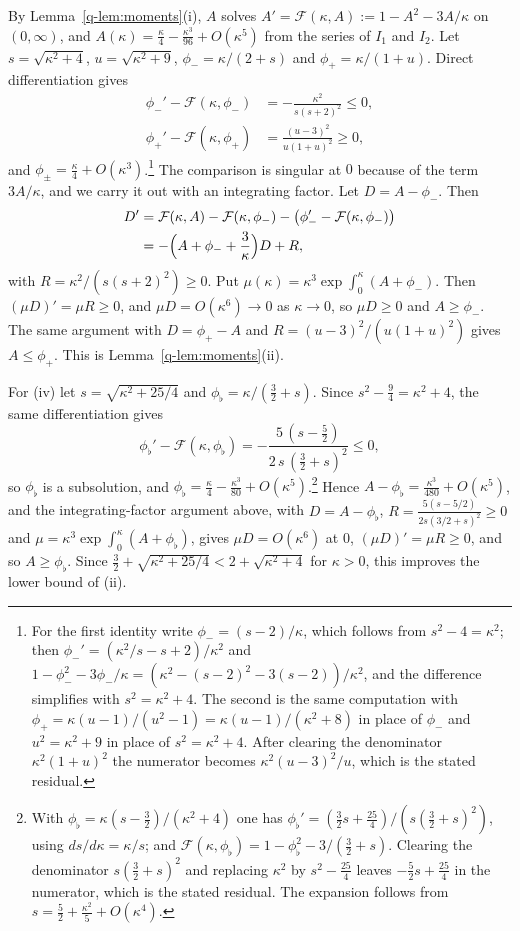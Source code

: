 By Lemma~\ref{q-lem:moments}(i), $A$ solves $A'=\mathcal F(\kappa,A):=1-A^2-
3A/\kappa$ on $(0,\infty)$, and $A(\kappa)=\frac\kappa4-\frac{\kappa^3}{96}+
O(\kappa^5)$ from the series of $I_1$ and $I_2$. Let $s=\sqrt{\kappa^2+4}$,
$u=\sqrt{\kappa^2+9}$, $\phi_-=\kappa/(2+s)$ and $\phi_+=\kappa/(1+u)$. Direct
differentiation gives
\[
\begin{aligned}
\phi_-'-\mathcal F(\kappa,\phi_-)&=-\frac{\kappa^2}{s(s+2)^2}\le0,\\
\phi_+'-\mathcal F(\kappa,\phi_+)&=\frac{(u-3)^2}{u(1+u)^2}\ge0,
\end{aligned}
\]
and $\phi_\pm=\frac\kappa4+O(\kappa^3)$.\footnote{For the first identity write
$\phi_-=(s-2)/\kappa$, which follows from $s^2-4=\kappa^2$; then
$\phi_-'=(\kappa^2/s-s+2)/\kappa^2$ and $1-\phi_-^2-3\phi_-/\kappa=
(\kappa^2-(s-2)^2-3(s-2))/\kappa^2$, and the difference simplifies with
$s^2=\kappa^2+4$. The second is the same computation with
$\phi_+=\kappa(u-1)/(u^2-1)=\kappa(u-1)/(\kappa^2+8)$ in place of $\phi_-$
and $u^2=\kappa^2+9$ in place of $s^2=\kappa^2+4$. After clearing the denominator $\kappa^2(1+u)^2$ the
numerator becomes $\kappa^2(u-3)^2/u$, which is the stated residual.} The comparison is singular at $0$
because of the term $3A/\kappa$, and we carry it out with an integrating
factor. Let $D=A-\phi_-$. Then
\[
\begin{aligned}
D'&=\mathcal F(\kappa,A)-\mathcal F(\kappa,\phi_-)-\bigl(\phi_-'-\mathcal F(
\kappa,\phi_-)\bigr)\\
&=-\Bigl(A+\phi_-+\frac3\kappa\Bigr)D+R,
\end{aligned}
\]
with $R=\kappa^2/(s(s+2)^2)\ge0$. Put $\mu(\kappa)=\kappa^3\exp\int_0^\kappa
(A+\phi_-)$. Then $(\mu D)'=\mu R\ge0$, and $\mu D=O(\kappa^6)\to0$ as
$\kappa\to0$, so $\mu D\ge0$ and $A\ge\phi_-$. The same argument with
$D=\phi_+-A$ and $R=(u-3)^2/(u(1+u)^2)$ gives $A\le\phi_+$. This is
Lemma~\ref{q-lem:moments}(ii).

For (iv) let $s=\sqrt{\kappa^2+25/4}$ and $\phi_\flat=\kappa/(\frac32+s)$.
Since $s^2-\frac94=\kappa^2+4$, the same differentiation gives
\[
\phi_\flat'-\mathcal F(\kappa,\phi_\flat)=-\frac{5\,(s-\frac52)}{2\,s\,
(\frac32+s)^2}\le0,
\]
so $\phi_\flat$ is a subsolution, and $\phi_\flat=\frac\kappa4-\frac{\kappa^3}
{80}+O(\kappa^5)$.\footnote{With $\phi_\flat=\kappa(s-\frac32)/(\kappa^2+4)$ one
has $\phi_\flat'=(\frac32 s+\frac{25}4)/(s(\frac32+s)^2)$, using $ds/d\kappa=
\kappa/s$; and $\mathcal F(\kappa,\phi_\flat)=1-\phi_\flat^2-3/(\frac32+s)$.
Clearing the denominator $s(\frac32+s)^2$ and replacing $\kappa^2$ by
$s^2-\frac{25}4$ leaves $-\frac52 s+\frac{25}4$ in the numerator, which is the
stated residual. The expansion follows from $s=\frac52+\frac{\kappa^2}5+
O(\kappa^4)$.} Hence $A-\phi_\flat=\frac{\kappa^3}{480}+O(\kappa^5)$, and the
integrating-factor argument above, with $D=A-\phi_\flat$, $R=\frac{5(s-5/2)}
{2s(3/2+s)^2}\ge0$ and $\mu=\kappa^3\exp\int_0^\kappa(A+\phi_\flat)$, gives
$\mu D=O(\kappa^6)$ at $0$, $(\mu D)'=\mu R\ge0$, and so $A\ge\phi_\flat$. Since
$\frac32+\sqrt{\kappa^2+25/4}<2+\sqrt{\kappa^2+4}$ for $\kappa>0$, this
improves the lower bound of (ii).


